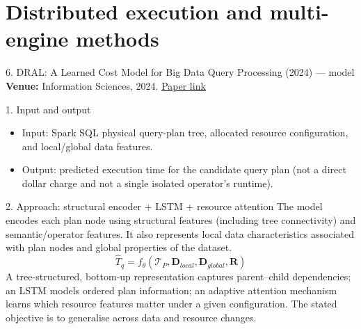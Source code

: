 \documentclass[aspectratio=169,10pt]{beamer}
\newcommand{\paperlink}[2]{\href{#1}{\textcolor{WayangTeal}{\underline{#2}}}}
\begin{document}
\section{Distributed execution and multi-engine methods}
\begin{frame}[shrink=10]{6. DRAL: A Learned Cost Model for Big Data Query Processing (2024) — model}
\small
\textbf{Venue:} Information Sciences, 2024. \hfill\paperlink{https://doi.org/10.1016/j.ins.2024.120650}{Paper link}

\begin{block}{1. Input and output}
\begin{itemize}\setlength\itemsep{1pt}
  \item Input: Spark SQL physical query-plan tree, allocated resource configuration, and local/global data features.
  \item Output: predicted execution time for the candidate query plan (not a direct dollar charge and not a single isolated operator's runtime).
\end{itemize}
\end{block}

\begin{block}{2. Approach: structural encoder + LSTM + resource attention}
The model encodes each plan node using structural features (including tree connectivity) and semantic/operator features. It also represents local data characteristics associated with plan nodes and global properties of the dataset.
\[
  \widehat T_q = f_\theta(\mathcal T_P,\mathbf D_{local},\mathbf D_{global},\mathbf R)
\]
A tree-structured, bottom-up representation captures parent--child dependencies; an LSTM models ordered plan information; an adaptive attention mechanism learns which resource features matter under a given configuration. The stated objective is to generalise across data and resource changes.
\end{block}
\end{frame}
\end{document}
